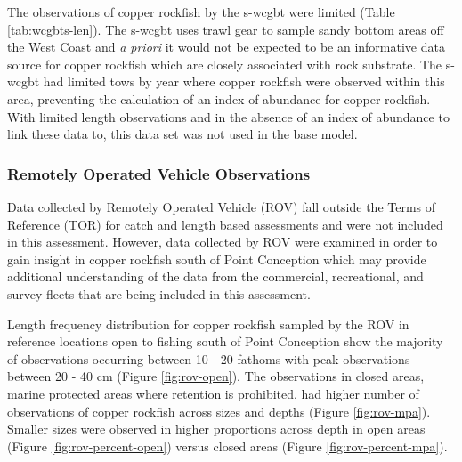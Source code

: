\documentclass[11pt,
  english,
  a4paper,
]{article}
\begin{document}
\leavevmode\tagmcend\tagstructend\par


The observations of copper rockfish by the \gls{s-wcgbt} were limited (Table \ref{tab:wcgbts-len}). The \gls{s-wcgbt} uses trawl gear to sample sandy bottom areas off the West Coast and \emph{a priori} it would not be expected to be an informative data source for copper rockfish which are closely associated with rock substrate. The \gls{s-wcgbt} had limited tows by year where copper rockfish were observed within this area, preventing the calculation of an index of abundance for copper rockfish. With limited length observations and in the absence of an index of abundance to link these data to, this data set was not used in the base model.

\leavevmode\tagmcend\tagstructend\par


\hypertarget{remotely-operated-vehicle-observations}{%
\subsubsection{Remotely Operated Vehicle Observations}\label{remotely-operated-vehicle-observations}}

\leavevmode\tagmcend\tagstructend


Data collected by Remotely Operated Vehicle (ROV) fall outside the Terms of Reference (TOR) for catch and length based assessments and were not included in this assessment. However, data collected by ROV were examined in order to gain insight in copper rockfish south of Point Conception which may provide additional understanding of the data from the commercial, recreational, and survey fleets that are being included in this assessment.

\leavevmode\tagmcend\tagstructend\par


Length frequency distribution for copper rockfish sampled by the ROV in reference locations open to fishing south of Point Conception show the majority of observations occurring between 10 - 20 fathoms with peak observations between 20 - 40 cm (Figure \ref{fig:rov-open}). The observations in closed areas, marine protected areas where retention is prohibited, had higher number of observations of copper rockfish across sizes and depths (Figure \ref{fig:rov-mpa}). Smaller sizes were observed in higher proportions across depth in open areas (Figure \ref{fig:rov-percent-open}) versus closed areas (Figure \ref{fig:rov-percent-mpa}).
\end{document}
